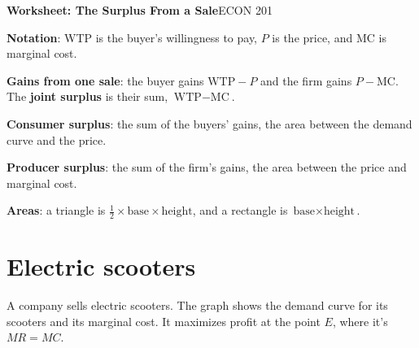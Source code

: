\documentclass[11pt]{article}
\begin{document}
{\LARGE\bfseries\color{accent} Worksheet: The Surplus From a Sale}\hfill{\large ECON 201}

\newcommand{\term}[1]{\textcolor{accentdark}{\textbf{#1}}}

\newenvironment{deflist}
  {\begin{list}{\textbullet}{%
     \setlength{\leftmargin}{1.1em}\setlength{\labelwidth}{0.7em}%
     \setlength{\labelsep}{0.4em}\setlength{\itemindent}{0pt}%
     \setlength{\listparindent}{0pt}\setlength{\topsep}{2pt}%
     \setlength{\partopsep}{0pt}\setlength{\parsep}{0pt}%
     \setlength{\itemsep}{2pt}}}
  {\end{list}}

\begin{tcolorbox}[colback=cream, colframe=accent, boxrule=0.6pt, arc=2pt,
  left=6pt, right=6pt, top=4pt, bottom=4pt, title=Definitions,
  fonttitle=\bfseries, coltitle=white]
\begin{deflist}
\item \term{Notation}: WTP is the buyer's willingness to pay, $P$ is the
  price, and MC is marginal cost.
\item \term{Gains from one sale}: the buyer gains $\text{WTP} - P$ and the firm
  gains $P - \text{MC}$. The \term{joint surplus} is their sum,
  $\text{WTP} - \text{MC}$.
\item \term{Consumer surplus}: the sum of the buyers' gains, the area between
  the demand curve and the price.
\item \term{Producer surplus}: the sum of the firm's gains, the area between
  the price and marginal cost.
\item \term{Areas}: a triangle is $\tfrac{1}{2} \times \text{base} \times
  \text{height}$, and a rectangle is $\text{base} \times \text{height}$.
\end{deflist}
\end{tcolorbox}

\section{Electric scooters}

A company sells electric scooters. The graph shows the demand curve for its
scooters and its marginal cost. It maximizes profit at the point $E$, where it's $MR=MC$.
\end{document}
